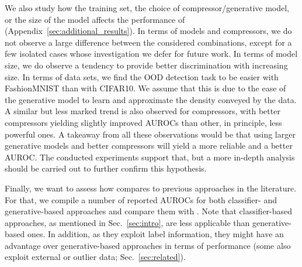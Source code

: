 \documentclass[letterpaper]{article} \usepackage{iclr2020_conference,times}
\begin{document}
We also study how the training set, the choice of compressor/generative model, or the size of the model affects the performance of  (Appendix~\ref{sec:additional_results}). In terms of models and compressors, we do not observe a large difference between the considered combinations, except for a few isolated cases whose investigation we defer for future work. In terms of model size, we do observe a tendency to provide better discrimination with increasing size. In terms of data sets, we find the OOD detection task to be easier with FashionMNIST than with CIFAR10. We assume that this is due to the ease of the generative model to learn and approximate the density conveyed by the data. A similar but less marked trend is also observed for compressors, with better compressors yielding slightly improved AUROCs than other, in principle, less powerful ones. A takeaway from all these observations would be that using larger generative models and better compressors will yield a more reliable  and a better AUROC. The conducted experiments support that, but a more in-depth analysis should be carried out to further confirm this hypothesis.

Finally, we want to assess how  compares to previous approaches in the literature. For that, we compile a number of reported AUROCs for both classifier- and generative-based approaches and compare them with . Note that classifier-based approaches, as mentioned in Sec.~\ref{sec:intro}, are less applicable than generative-based ones. In addition, as they exploit label information, they might have an advantage over generative-based approaches in terms of performance (some also exploit external or outlier data; Sec.~\ref{sec:related}).
\end{document}

